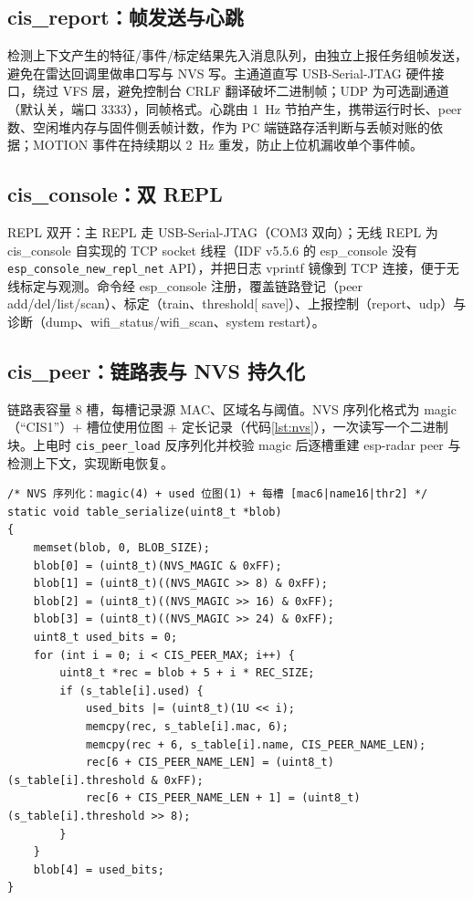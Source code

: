 \subsection{cis\_report：帧发送与心跳}

检测上下文产生的特征/事件/标定结果先入消息队列，由独立上报任务组帧发送，避免在雷达回调里做串口写与 NVS 写。主通道直写 USB-Serial-JTAG 硬件接口，绕过 VFS 层，避免控制台 CRLF 翻译破坏二进制帧；UDP 为可选副通道（默认关，端口 3333），同帧格式。心跳由 1~Hz 节拍产生，携带运行时长、peer 数、空闲堆内存与固件侧丢帧计数，作为 PC 端链路存活判断与丢帧对账的依据；MOTION 事件在持续期以 2~Hz 重发，防止上位机漏收单个事件帧。

\subsection{cis\_console：双 REPL}

REPL 双开：主 REPL 走 USB-Serial-JTAG（COM3 双向）；无线 REPL 为 cis\_console 自实现的 TCP socket 线程（IDF v5.5.6 的 esp\_console 没有 \texttt{esp\_console\_new\_repl\_net} API），并把日志 vprintf 镜像到 TCP 连接，便于无线标定与观测。命令经 esp\_console 注册，覆盖链路登记（peer add/del/list/scan）、标定（train、threshold[ save]）、上报控制（report、udp）与诊断（dump、wifi\_status/wifi\_scan、system restart）。

\subsection{cis\_peer：链路表与 NVS 持久化}

链路表容量 8 槽，每槽记录源 MAC、区域名与阈值。NVS 序列化格式为 magic（``CIS1''）+ 槽位使用位图 + 定长记录（代码\ref{lst:nvs}），一次读写一个二进制块。上电时 \texttt{cis\_peer\_load} 反序列化并校验 magic 后逐槽重建 esp-radar peer 与检测上下文，实现断电恢复。

\begin{lstlisting}[style=cstyle, caption={链路表 NVS 序列化（cis\_peer.c 节选）}, label={lst:nvs}]
/* NVS 序列化：magic(4) + used 位图(1) + 每槽 [mac6|name16|thr2] */
static void table_serialize(uint8_t *blob)
{
    memset(blob, 0, BLOB_SIZE);
    blob[0] = (uint8_t)(NVS_MAGIC & 0xFF);
    blob[1] = (uint8_t)((NVS_MAGIC >> 8) & 0xFF);
    blob[2] = (uint8_t)((NVS_MAGIC >> 16) & 0xFF);
    blob[3] = (uint8_t)((NVS_MAGIC >> 24) & 0xFF);
    uint8_t used_bits = 0;
    for (int i = 0; i < CIS_PEER_MAX; i++) {
        uint8_t *rec = blob + 5 + i * REC_SIZE;
        if (s_table[i].used) {
            used_bits |= (uint8_t)(1U << i);
            memcpy(rec, s_table[i].mac, 6);
            memcpy(rec + 6, s_table[i].name, CIS_PEER_NAME_LEN);
            rec[6 + CIS_PEER_NAME_LEN] = (uint8_t)(s_table[i].threshold & 0xFF);
            rec[6 + CIS_PEER_NAME_LEN + 1] = (uint8_t)(s_table[i].threshold >> 8);
        }
    }
    blob[4] = used_bits;
}
\end{lstlisting}


